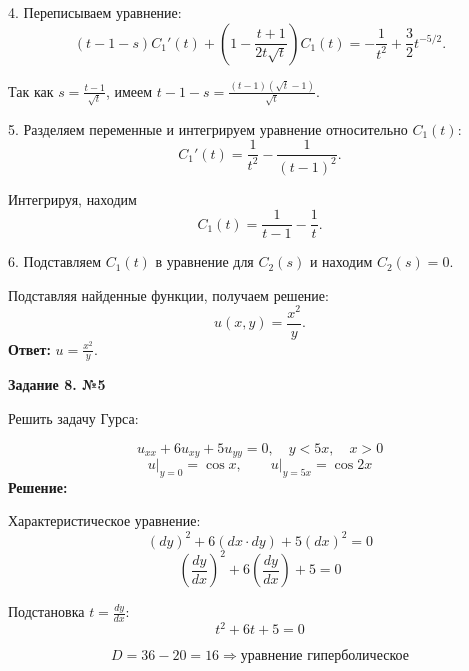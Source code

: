 \documentclass[a4paper,12pt]{article}
\begin{document}
4. Переписываем уравнение:
   \begin{equation*}
       (t - 1 - s) C_1'(t) + \left(1 - \frac{t + 1}{2t \sqrt{t}} \right) C_1(t) = -\frac{1}{t^2} + \frac{3}{2} t^{-5/2}.
   \end{equation*}
   
   Так как $ s = \frac{t - 1}{\sqrt{t}} $, имеем $ t - 1 - s = \frac{(t - 1)(\sqrt{t} - 1)}{\sqrt{t}} $.
   
5. Разделяем переменные и интегрируем уравнение относительно $ C_1(t) $:
   \begin{equation*}
       C_1'(t) = \frac{1}{t^2} - \frac{1}{(t - 1)^2}.
   \end{equation*}
   
   Интегрируя, находим
   \begin{equation*}
       C_1(t) = \frac{1}{t - 1} - \frac{1}{t}.
   \end{equation*}
   
6. Подставляем $ C_1(t) $ в уравнение для $ C_2(s) $ и находим $ C_2(s) = 0 $.

Подставляя найденные функции, получаем решение:
\begin{equation*}
    u(x,y) = \frac{x^2}{y}.
\end{equation*}
\textbf{Ответ:} $u =\frac{x^2}{y}$.


\vspace{14mm}
\begin{center}    
    \textbf{Задание 8. №5}
\end{center}

Решить задачу Гурса:

\begin{equation*}
    u_{xx} + 6 u_{xy} + 5u_{yy} = 0, \quad y<5x, \quad  x>0
\end{equation*}
\[
u \Big|_{y=0} = \cos x, \quad \quad  u \Big|_{y=5x} = \cos 2x
\]
\textbf{Решение:}

Характеристическое уравнение:
\begin{equation*}
     (dy)^2 + 6 (dx \cdot dy) + 5(dx)^2=0
\end{equation*}
\begin{equation*}
\left( \frac{dy}{dx} \right)^2 + 6 \left( \frac{dy}{dx} \right) + 5=0
\end{equation*}

Подстановка $t = \frac{dy}{dx}$:
\begin{equation*}
    t^2 + 6 t + 5=0
\end{equation*}

\begin{equation*}
    D = 36 - 20 = 16 \Rightarrow \text{уравнение гиперболическое}
\end{equation*}
\end{document}
